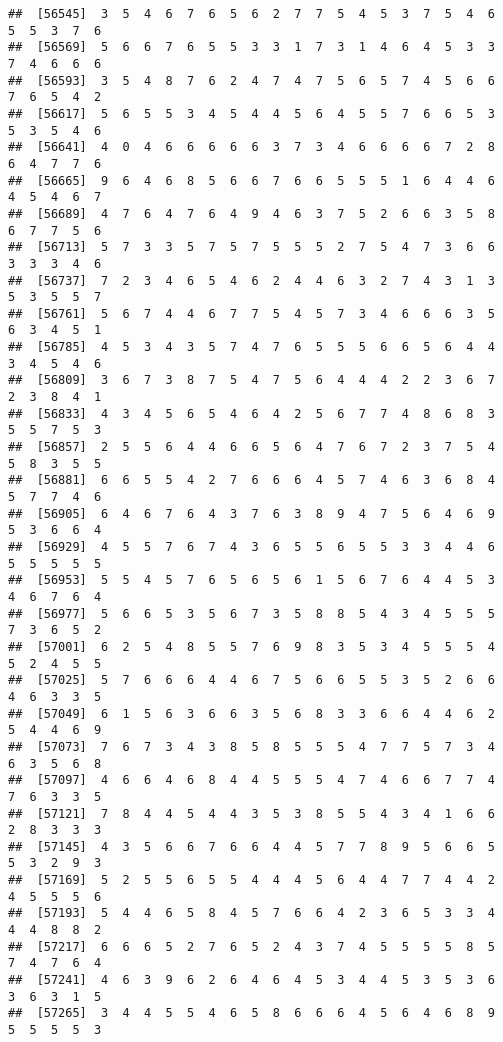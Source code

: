 \documentclass[
]{book}
\begin{document}
\begin{verbatim}
##  [56545]  3  5  4  6  7  6  5  6  2  7  7  5  4  5  3  7  5  4  6  5  5  3  7  6
##  [56569]  5  6  6  7  6  5  5  3  3  1  7  3  1  4  6  4  5  3  3  7  4  6  6  6
##  [56593]  3  5  4  8  7  6  2  4  7  4  7  5  6  5  7  4  5  6  6  7  6  5  4  2
##  [56617]  5  6  5  5  3  4  5  4  4  5  6  4  5  5  7  6  6  5  3  5  3  5  4  6
##  [56641]  4  0  4  6  6  6  6  6  3  7  3  4  6  6  6  6  7  2  8  6  4  7  7  6
##  [56665]  9  6  4  6  8  5  6  6  7  6  6  5  5  5  1  6  4  4  6  4  5  4  6  7
##  [56689]  4  7  6  4  7  6  4  9  4  6  3  7  5  2  6  6  3  5  8  6  7  7  5  6
##  [56713]  5  7  3  3  5  7  5  7  5  5  5  2  7  5  4  7  3  6  6  3  3  3  4  6
##  [56737]  7  2  3  4  6  5  4  6  2  4  4  6  3  2  7  4  3  1  3  5  3  5  5  7
##  [56761]  5  6  7  4  4  6  7  7  5  4  5  7  3  4  6  6  6  3  5  6  3  4  5  1
##  [56785]  4  5  3  4  3  5  7  4  7  6  5  5  5  6  6  5  6  4  4  3  4  5  4  6
##  [56809]  3  6  7  3  8  7  5  4  7  5  6  4  4  4  2  2  3  6  7  2  3  8  4  1
##  [56833]  4  3  4  5  6  5  4  6  4  2  5  6  7  7  4  8  6  8  3  5  5  7  5  3
##  [56857]  2  5  5  6  4  4  6  6  5  6  4  7  6  7  2  3  7  5  4  5  8  3  5  5
##  [56881]  6  6  5  5  4  2  7  6  6  6  4  5  7  4  6  3  6  8  4  5  7  7  4  6
##  [56905]  6  4  6  7  6  4  3  7  6  3  8  9  4  7  5  6  4  6  9  5  3  6  6  4
##  [56929]  4  5  5  7  6  7  4  3  6  5  5  6  5  5  3  3  4  4  6  5  5  5  5  5
##  [56953]  5  5  4  5  7  6  5  6  5  6  1  5  6  7  6  4  4  5  3  4  6  7  6  4
##  [56977]  5  6  6  5  3  5  6  7  3  5  8  8  5  4  3  4  5  5  5  7  3  6  5  2
##  [57001]  6  2  5  4  8  5  5  7  6  9  8  3  5  3  4  5  5  5  4  5  2  4  5  5
##  [57025]  5  7  6  6  6  4  4  6  7  5  6  6  5  5  3  5  2  6  6  4  6  3  3  5
##  [57049]  6  1  5  6  3  6  6  3  5  6  8  3  3  6  6  4  4  6  2  5  4  4  6  9
##  [57073]  7  6  7  3  4  3  8  5  8  5  5  5  4  7  7  5  7  3  4  6  3  5  6  8
##  [57097]  4  6  6  4  6  8  4  4  5  5  5  4  7  4  6  6  7  7  4  7  6  3  3  5
##  [57121]  7  8  4  4  5  4  4  3  5  3  8  5  5  4  3  4  1  6  6  2  8  3  3  3
##  [57145]  4  3  5  6  6  7  6  6  4  4  5  7  7  8  9  5  6  6  5  5  3  2  9  3
##  [57169]  5  2  5  5  6  5  5  4  4  4  5  6  4  4  7  7  4  4  2  4  5  5  5  6
##  [57193]  5  4  4  6  5  8  4  5  7  6  6  4  2  3  6  5  3  3  4  4  4  8  8  2
##  [57217]  6  6  6  5  2  7  6  5  2  4  3  7  4  5  5  5  5  8  5  7  4  7  6  4
##  [57241]  4  6  3  9  6  2  6  4  6  4  5  3  4  4  5  3  5  3  6  3  6  3  1  5
##  [57265]  3  4  4  5  5  4  6  5  8  6  6  6  4  5  6  4  6  8  9  5  5  5  5  3

\end{verbatim}
\end{document}
